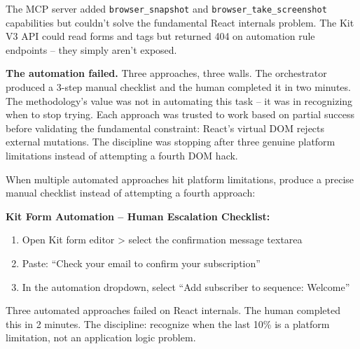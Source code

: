 \documentclass[
  a4paper,
  DIV=11,
  numbers=noendperiod]{scrreprt}
\providecommand{\tightlist}{%
  \setlength{\itemsep}{0pt}\setlength{\parskip}{0pt}}
\begin{document}
The MCP server added \texttt{browser\_snapshot} and
\texttt{browser\_take\_screenshot} capabilities but couldn't solve the
fundamental React internals problem. The Kit V3 API could read forms and
tags but returned 404 on automation rule endpoints -- they simply aren't
exposed.

\textbf{The automation failed.} Three approaches, three walls. The
orchestrator produced a 3-step manual checklist and the human completed
it in two minutes. The methodology's value was not in automating this
task -- it was in recognizing when to stop trying. Each approach was
trusted to work based on partial success before validating the
fundamental constraint: React's virtual DOM rejects external mutations.
The discipline was stopping after three genuine platform limitations
instead of attempting a fourth DOM hack.

\begin{tcolorbox}[enhanced jigsaw, arc=.35mm, bottomrule=.15mm, bottomtitle=1mm, breakable, colback=white, colbacktitle=quarto-callout-tip-color!10!white, colframe=quarto-callout-tip-color-frame, coltitle=black, left=2mm, leftrule=.75mm, opacityback=0, opacitybacktitle=0.6, rightrule=.15mm, title=\textcolor{quarto-callout-tip-color}{\faLightbulb}\hspace{0.5em}{Try This: The Escalation Checklist}, titlerule=0mm, toprule=.15mm, toptitle=1mm]

When multiple automated approaches hit platform limitations, produce a
precise manual checklist instead of attempting a fourth approach:

\textbf{Kit Form Automation -- Human Escalation Checklist:}

\begin{enumerate}
\def\labelenumi{\arabic{enumi}.}
\tightlist
\item
  Open Kit form editor \textgreater{} select the confirmation message
  textarea
\item
  Paste: ``Check your email to confirm your subscription''
\item
  In the automation dropdown, select ``Add subscriber to sequence:
  Welcome''
\end{enumerate}

Three automated approaches failed on React internals. The human
completed this in 2 minutes. The discipline: recognize when the last
10\% is a platform limitation, not an application logic problem.

\end{tcolorbox}
\end{document}

